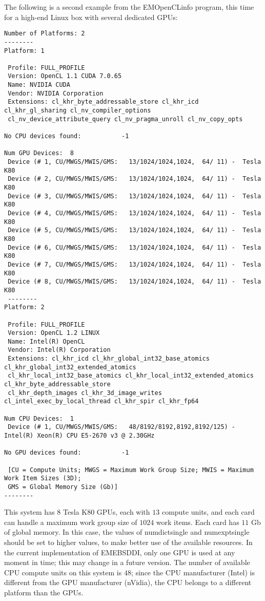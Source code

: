 \documentclass[DIV=calc, paper=letter, fontsize=11pt]{scrartcl}	 %
\begin{document}
The following is a second example from the \textsf{EMOpenCLinfo} program, this time for a high-end Linux box with 
several dedicated GPUs:

{\footnotesize\begin{verbatim}
Number of Platforms: 2
--------
Platform: 1

 Profile: FULL_PROFILE
 Version: OpenCL 1.1 CUDA 7.0.65
 Name: NVIDIA CUDA
 Vendor: NVIDIA Corporation
 Extensions: cl_khr_byte_addressable_store cl_khr_icd cl_khr_gl_sharing cl_nv_compiler_options 
 cl_nv_device_attribute_query cl_nv_pragma_unroll cl_nv_copy_opts 

No CPU devices found:           -1

Num GPU Devices:  8
 Device (# 1, CU/MWGS/MWIS/GMS:   13/1024/1024,1024,  64/ 11) -  Tesla K80
 Device (# 2, CU/MWGS/MWIS/GMS:   13/1024/1024,1024,  64/ 11) -  Tesla K80
 Device (# 3, CU/MWGS/MWIS/GMS:   13/1024/1024,1024,  64/ 11) -  Tesla K80
 Device (# 4, CU/MWGS/MWIS/GMS:   13/1024/1024,1024,  64/ 11) -  Tesla K80
 Device (# 5, CU/MWGS/MWIS/GMS:   13/1024/1024,1024,  64/ 11) -  Tesla K80
 Device (# 6, CU/MWGS/MWIS/GMS:   13/1024/1024,1024,  64/ 11) -  Tesla K80
 Device (# 7, CU/MWGS/MWIS/GMS:   13/1024/1024,1024,  64/ 11) -  Tesla K80
 Device (# 8, CU/MWGS/MWIS/GMS:   13/1024/1024,1024,  64/ 11) -  Tesla K80
 --------
Platform: 2

 Profile: FULL_PROFILE
 Version: OpenCL 1.2 LINUX
 Name: Intel(R) OpenCL
 Vendor: Intel(R) Corporation
 Extensions: cl_khr_icd cl_khr_global_int32_base_atomics cl_khr_global_int32_extended_atomics 
 cl_khr_local_int32_base_atomics cl_khr_local_int32_extended_atomics cl_khr_byte_addressable_store 
 cl_khr_depth_images cl_khr_3d_image_writes cl_intel_exec_by_local_thread cl_khr_spir cl_khr_fp64 

Num CPU Devices:  1
 Device (# 1, CU/MWGS/MWIS/GMS:   48/8192/8192,8192,8192/125) -  Intel(R) Xeon(R) CPU E5-2670 v3 @ 2.30GHz
 
No GPU devices found:           -1
  
 [CU = Compute Units; MWGS = Maximum Work Group Size; MWIS = Maximum Work Item Sizes (3D); 
 GMS = Global Memory Size (Gb)]
--------
\end{verbatim}}
This system has $8$ Tesla K80 GPUs, each with $13$ compute units, and each card can handle a maximum work group size 
of $1024$ work items. Each card has $11$ Gb of global memory.  In this case, the values of \textsf{numdictsingle} and \textsf{numexptsingle} should be set to higher values,
to make better use of the available resources.  In the current implementation of \textsf{EMEBSDDI}, only one GPU 
is used at any moment in time; this may change in a future version.  The number of available CPU compute units on this system is $48$;
since the CPU manufacturer (Intel) is different from the GPU manufacturer (nVidia), the CPU belongs to a different platform than the GPUs.
\end{document}
